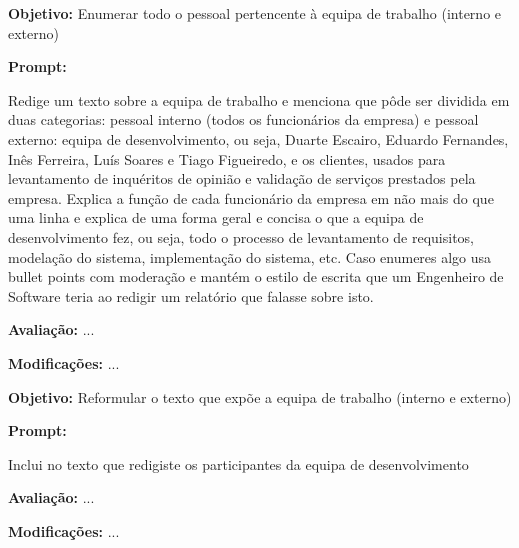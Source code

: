 \documentclass[a4paper,12pt]{scrreprt}
\begin{document}
\begin{tcolorbox}[
	title={Prompt P8 - Enumeração da Equipa de Trabalho},
	colback=white,
	colframe=black,
	arc=2mm,
	boxrule=0.5pt
	]
	\textbf{Objetivo:} Enumerar todo o pessoal pertencente à equipa de trabalho (interno e externo) \par
	\textbf{Prompt:} 
	\begin{tcolorbox}[
		listing only,
		breakable,
		enhanced,
		colback=white,
		colframe=black,
		listing options={
			breaklines=true,
			basicstyle=\ttfamily\small
		}
		]
		Redige um texto sobre a equipa de trabalho e menciona que pôde ser dividida em duas categorias: pessoal interno (todos os funcionários da empresa) e pessoal externo: equipa de desenvolvimento, ou seja, Duarte Escairo, Eduardo Fernandes, Inês Ferreira, Luís Soares e Tiago Figueiredo, e os clientes, usados para levantamento de inquéritos de opinião e validação de serviços prestados pela empresa. Explica a função de cada funcionário da empresa em não mais do que uma linha e explica de uma forma geral e concisa o que a equipa de desenvolvimento fez, ou seja, todo o processo de levantamento de requisitos, modelação do sistema,
		implementação do sistema, etc.
		Caso enumeres algo usa bullet points com moderação e mantém o estilo de escrita que um Engenheiro de Software teria ao redigir um relatório que falasse sobre isto.

	\end{tcolorbox}
	\par
	\textbf{Avaliação:} ... \par
	\textbf{Modificações:} ... \par
\end{tcolorbox}

\begin{tcolorbox}[
	title={Prompt P9 - Reformulação do texto da Equipa de Trabalho},
	colback=white,
	colframe=black,
	arc=2mm,
	boxrule=0.5pt
	]
	\textbf{Objetivo:} Reformular o texto que expõe a equipa de trabalho (interno e externo) \par
	\textbf{Prompt:} 
	\begin{tcolorbox}[
		listing only,
		breakable,
		enhanced,
		colback=white,
		colframe=black,
		listing options={
			breaklines=true,
			basicstyle=\ttfamily\small
		}
		]
		Inclui no texto que redigiste os participantes da equipa de desenvolvimento
	\end{tcolorbox}
	\par
	\textbf{Avaliação:} ... \par
	\textbf{Modificações:} ... \par
\end{tcolorbox}
\end{document}

